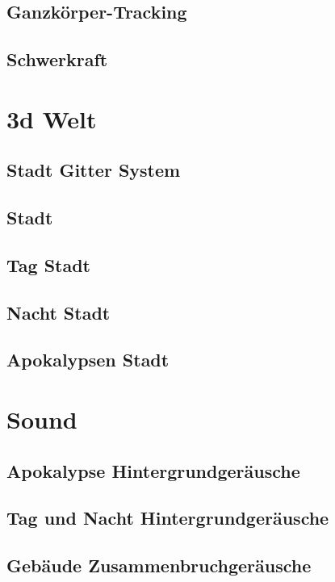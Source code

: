 \subsection{Ganzkörper-Tracking}\label{subsec:full-body-tracking}
\subsection{Schwerkraft}\label{subsec:gravity}
\section{3d Welt}\label{sec:3d-world}
\subsection{Stadt Gitter System}\label{subsec:city-grid-system}
\subsection{Stadt}\label{subsec:city}
\subsection{Tag Stadt}\label{subsec:day-city}
\subsection{Nacht Stadt}\label{subsec:night-city}
\subsection{Apokalypsen Stadt}\label{subsec:apocalypse-city}
\section{Sound}\label{sec:sound}
\subsection{Apokalypse Hintergrundgeräusche}\label{subsec:apocalypse-background-sound}
\subsection{Tag und Nacht Hintergrundgeräusche}\label{subsec:day-night-background-sound}
\subsection{Gebäude Zusammenbruchgeräusche}\label{subsec:building-collapse-sound}
